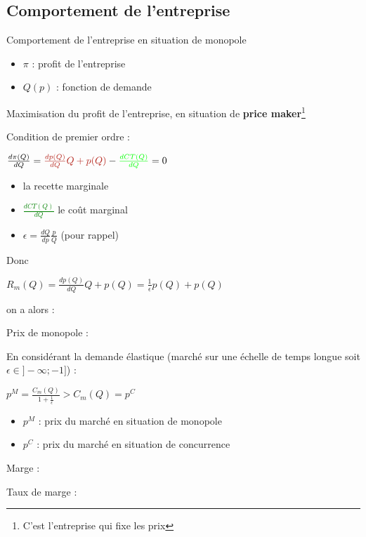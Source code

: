 \subsection{Comportement de l'entreprise}
Comportement de l'entreprise en situation de monopole
\begin{itemize}
    \item $\pi$ : profit de l'entreprise
    \item $Q(p)$ : fonction de demande
\end{itemize}
Maximisation du profit de l'entreprise, en situation de \textbf{price maker}\footnote{C'est l'entreprise qui fixe les prix}
\begin{center}
    \Large{}
\end{center}
Condition de premier ordre :
\begin{center}
    \Large{}
\end{center}
\begin{center}
    \Large{$\frac{d\pi(Q)}{dQ} = \textcolor{BrickRed}{\frac{dp(Q)}{dQ}Q + p(Q)} - \textcolor{green}{\frac{dCT(Q)}{dQ}} = 0$}
\end{center}
\begin{itemize}
    \item{} la recette marginale \newline
    \item \textcolor{green}{$\frac{dCT(Q)}{dQ}$} le coût marginal \newline
    \item $\epsilon = \frac{dQ}{dp}\frac{p}{Q}$ (pour rappel)
\end{itemize}
Donc
\begin{center}
    $R_{m}(Q) = \frac{dp(Q)}{dQ}Q + p(Q) = \frac{1}{\epsilon}p(Q) + p(Q)$
\end{center}
on a alors : 
\begin{center}
    \Large{}
\end{center}
\newpage
Prix de monopole :
\begin{center}
    \LARGE{}
\end{center}
En considérant la demande élastique (marché sur une échelle de temps longue soit $\epsilon \in ]-\infty;-1]$) :
\begin{center}
    \Large{$p^{M} = \frac{C_{m}(Q)}{1+\frac{1}{\epsilon}} > C_{m}(Q) = p^{C}$}
\end{center}
\begin{itemize}
    \item $p^{M}$ : prix du marché en situation de monopole
    \item $p^{C}$ : prix du marché en situation de concurrence
\end{itemize}
Marge :
\begin{center}
    \Large{}
\end{center}
Taux de marge :
\begin{center}
    \Large{}
\end{center}
